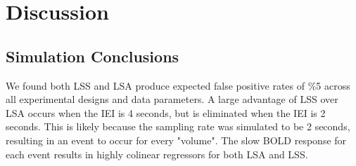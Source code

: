 \documentclass[10pt,letterpaper]{article}
\begin{document}





\section*{Discussion}
\label{discussion}

\subsection*{Simulation Conclusions}
\label{discussion:simulation-conclusions}

We found both LSS and LSA produce expected false positive rates of \%5
across all experimental designs and data parameters.
A large advantage of LSS over LSA occurs when the IEI is 4 seconds, but is eliminated
when the IEI is 2 seconds.
This is likely because the sampling rate was simulated to be 2 seconds, resulting
in an event to occur for every "volume".
The slow BOLD response for each event results in highly colinear regressors for both LSA and LSS.
\end{document}

